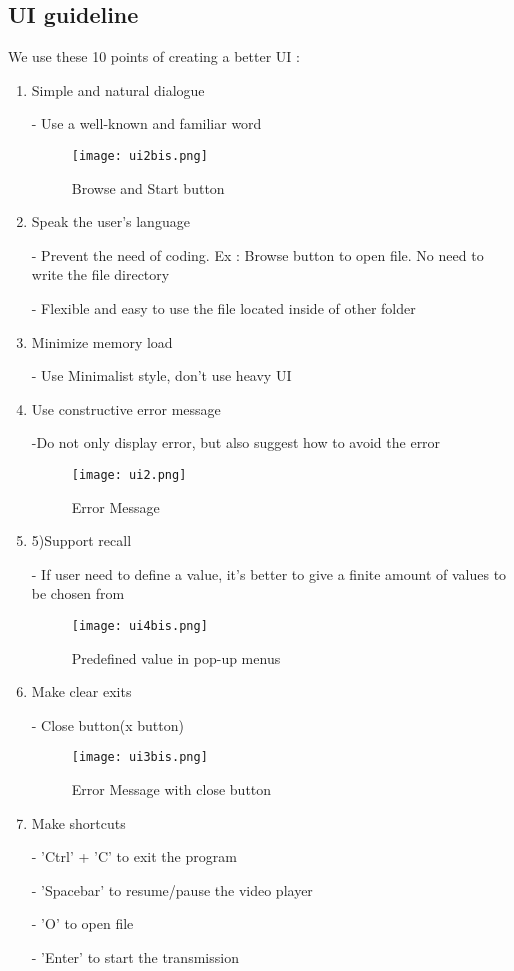 \documentclass[12pt,a4paper]{article}
\begin{document}
\subsection{UI guideline}
We use these 10 points of creating a better UI\cite{website:ux} :
\begin{enumerate}
\item Simple and natural dialogue
	\par - Use a well-known and familiar word
\begin{figure}[ht]
	\centering
			\texttt{[image: ui2bis.png]}
	\caption{Browse and Start button}
	\label{fig:browse-start }
\end{figure}
\item Speak the user’s language
	\par - Prevent the need of coding. Ex : Browse button to open file. No need to write the file directory 
	\par - Flexible and easy to use the file located inside of other folder
\item Minimize memory load
	\par - Use Minimalist style, don’t use heavy UI
\clearpage 
\item Use constructive error message
	\par -Do not only display error, but also suggest how to avoid the error
\begin{figure}[ht]
	\centering
			\texttt{[image: ui2.png]}
	\caption{Error Message}
	\label{fig: error }
\end{figure}
\item 5)Support recall
	\par - If user need to define a value, it’s better to give a finite amount of values to be chosen from
\begin{figure}[ht]
	\centering
			\texttt{[image: ui4bis.png]}
	\caption{Predefined value in pop-up menus}
	\label{fig: define-value }
\end{figure}

\item Make clear exits
	\par- Close button(x button)
\begin{figure}[ht]
	\centering
			\texttt{[image: ui3bis.png]}
	\caption{Error Message with close button}
	\label{fig: error-close }
\end{figure}

\item Make shortcuts
	\par - 'Ctrl' + 'C' to exit the program
	\par - 'Spacebar' to resume/pause the video player
	\par - 'O' to open file 
	\par - 'Enter' to start the transmission
	

\end{enumerate}
\end{document}
